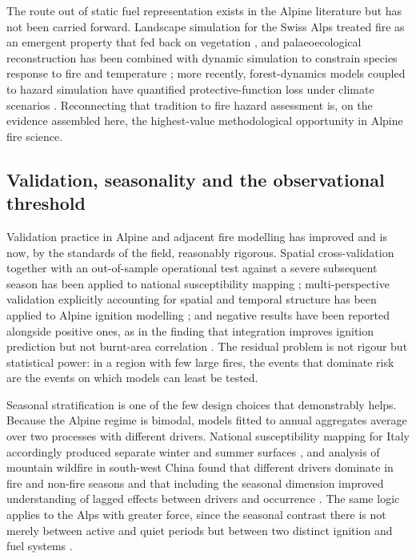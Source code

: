 \documentclass[11pt,a4paper]{article}
\begin{document}
The route out of static fuel representation exists in the Alpine literature but has not been carried forward. Landscape simulation for the Swiss Alps treated fire as an emergent property that fed back on vegetation \citep{schumacher_relative_2006}, and palaeoecological reconstruction has been combined with dynamic simulation to constrain species response to fire and temperature \citep{colombaroli_species_2010}; more recently, forest-dynamics models coupled to hazard simulation have quantified protective-function loss under climate scenarios \citep{hillebrand_contrasting_2023, moos_climate_2021}. Reconnecting that tradition to fire hazard assessment is, on the evidence assembled here, the highest-value methodological opportunity in Alpine fire science.

\subsection{Validation, seasonality and the observational threshold}

Validation practice in Alpine and adjacent fire modelling has improved and is now, by the standards of the field, reasonably rigorous. Spatial cross-validation together with an out-of-sample operational test against a severe subsequent season has been applied to national susceptibility mapping \citep{trucchia_defining_2022}; multi-perspective validation explicitly accounting for spatial and temporal structure has been applied to Alpine ignition modelling \citep{moreno_1_nodate}; and negative results have been reported alongside positive ones, as in the finding that integration improves ignition prediction but not burnt-area correlation \citep{muller_towards_2020}. The residual problem is not rigour but statistical power: in a region with few large fires, the events that dominate risk are the events on which models can least be tested.

Seasonal stratification is one of the few design choices that demonstrably helps. Because the Alpine regime is bimodal, models fitted to annual aggregates average over two processes with different drivers. National susceptibility mapping for Italy accordingly produced separate winter and summer surfaces \citep{trucchia_defining_2022}, and analysis of mountain wildfire in south-west China found that different drivers dominate in fire and non-fire seasons and that including the seasonal dimension improved understanding of lagged effects between drivers and occurrence \citep{wang_seasonal_2023}. The same logic applies to the Alps with greater force, since the seasonal contrast there is not merely between active and quiet periods but between two distinct ignition and fuel systems \citep{muller_forest_2020, bercak_combination_2024}.
\end{document}
